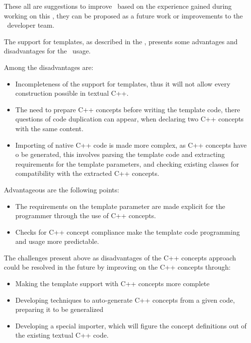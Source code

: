 These all are suggestions to improve \jbmps\ based on the experience gained during working on this \MT, they can be proposed as a future work or improvements 
to the \jbmps\ developer team.




The support for templates, as described in the , presents some advantages and 
disadvantages for the \pcpp\ usage. 

Among the disadvantages are:
\begin{itemize}
 \item Incompleteness of the support for templates, thus it will not allow every construction
 possible in textual C++.
 \item The need to prepare C++ concepts before writing the template code, there questions of 
 code duplication can appear, when declaring two C++ concepts with the same content.
 \item Importing of native C++ code is made more complex, as C++ concepts have o be generated,
 this involves parsing the template code and extracting requirements for the template parameters,
 and checking existing classes for compatibility with the extracted C++ concepts.
\end{itemize}


Advantageous are the following points:
\begin{itemize}
 \item The requirements on the template parameter are made explicit for the programmer through the 
 use of C++ concepts.
 \item Checks for C++ concept compliance make the template code programming and usage more
 predictable.
\end{itemize}

The challenges present above as disadvantages of the C++ concepts approach could be resolved
in the future by improving on the C++ concepts through:
\begin{itemize}
 \item Making the template support with C++ concepts more complete
 \item Developing techniques to auto-generate C++ concepts from a given code, 
 preparing it to be generalized
 \item Developing a special importer, which will figure the concept definitions out of
 the existing textual C++ code.
\end{itemize}

